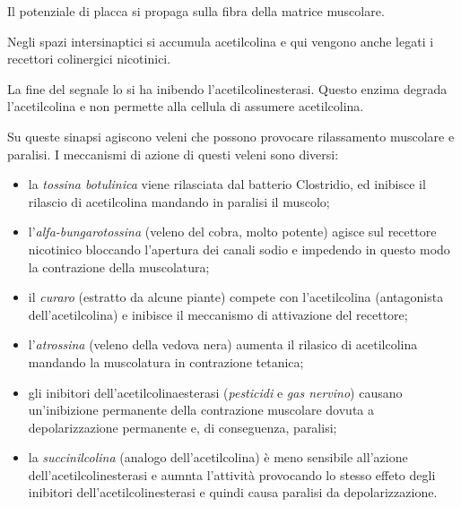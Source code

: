 \documentclass[]{article}
\begin{document}
Il potenziale di placca si propaga sulla fibra della matrice muscolare.

Negli spazi intersinaptici si accumula acetilcolina e qui vengono anche
legati i recettori colinergici nicotinici.

La fine del segnale lo si ha inibendo l'acetilcolinesterasi. Questo
enzima degrada l'acetilcolina e non permette alla cellula di assumere
acetilcolina.

Su queste sinapsi agiscono veleni che possono provocare rilassamento
muscolare e paralisi. I meccanismi di azione di questi veleni sono
diversi:

\begin{itemize}
\itemsep1pt\parskip0pt
\item
  la \emph{tossina botulinica} viene rilasciata dal batterio Clostridio,
  ed inibisce il rilascio di acetilcolina mandando in paralisi il
  muscolo;
\item
  l'\emph{alfa-bungarotossina} (veleno del cobra, molto potente) agisce
  sul recettore nicotinico bloccando l'apertura dei canali sodio e
  impedendo in questo modo la contrazione della muscolatura;
\item
  il \emph{curaro} (estratto da alcune piante) compete con
  l'acetilcolina (antagonista dell'acetilcolina) e inibisce il
  meccanismo di attivazione del recettore;
\item
  l'\emph{atrossina} (veleno della vedova nera) aumenta il rilasico di
  acetilcolina mandando la muscolatura in contrazione tetanica;
\item
  gli inibitori dell'acetilcolinaesterasi (\emph{pesticidi} e \emph{gas
  nervino}) causano un'inibizione permanente della contrazione muscolare
  dovuta a depolarizzazione permanente e, di conseguenza, paralisi;
\item
  la \emph{succinilcolina} (analogo dell'acetilcolina) è meno sensibile
  all'azione dell'acetilcolinesterasi e aumnta l'attività provocando lo
  stesso effeto degli inibitori dell'acetilcolinesterasi e quindi causa
  paralisi da depolarizzazione.
\end{itemize}
\end{document}
